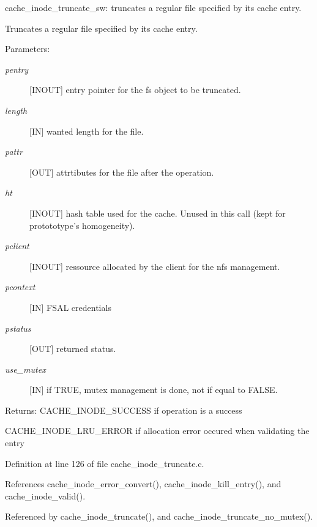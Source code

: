 cache\_\-inode\_\-truncate\_\-sw: truncates a regular file specified by its cache entry.

Truncates a regular file specified by its cache entry.

\begin{Desc}
\item[Parameters:]
\begin{description}
\item[{\em pentry}][INOUT] entry pointer for the fs object to be truncated. \item[{\em length}][IN] wanted length for the file. \item[{\em pattr}][OUT] attrtibutes for the file after the operation. \item[{\em ht}][INOUT] hash table used for the cache. Unused in this call (kept for protototype's homogeneity). \item[{\em pclient}][INOUT] ressource allocated by the client for the nfs management. \item[{\em pcontext}][IN] FSAL credentials \item[{\em pstatus}][OUT] returned status. \item[{\em use\_\-mutex}][IN] if TRUE, mutex management is done, not if equal to FALSE.\end{description}
\end{Desc}
\begin{Desc}
\item[Returns:]CACHE\_\-INODE\_\-SUCCESS if operation is a success \par
 

CACHE\_\-INODE\_\-LRU\_\-ERROR if allocation error occured when validating the entry \end{Desc}


Definition at line 126 of file cache\_\-inode\_\-truncate.c.

References cache\_\-inode\_\-error\_\-convert(), cache\_\-inode\_\-kill\_\-entry(), and cache\_\-inode\_\-valid().

Referenced by cache\_\-inode\_\-truncate(), and cache\_\-inode\_\-truncate\_\-no\_\-mutex().
